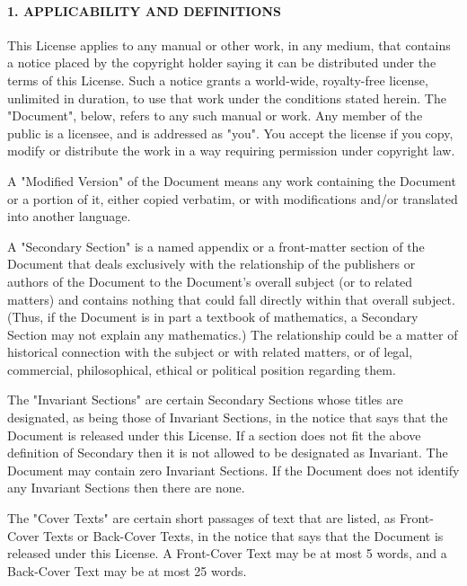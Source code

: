 \hypertarget{1-applicability-and-definitions}{%
\paragraph{1. APPLICABILITY AND
DEFINITIONS}\label{1-applicability-and-definitions}}

This License applies to any manual or other work, in any medium, that
contains a notice placed by the copyright holder saying it can be
distributed under the terms of this License. Such a notice grants a
world-wide, royalty-free license, unlimited in duration, to use that
work under the conditions stated herein. The "Document", below, refers
to any such manual or work. Any member of the public is a licensee, and
is addressed as "you". You accept the license if you copy, modify or
distribute the work in a way requiring permission under copyright law.

A "Modified Version" of the Document means any work containing the
Document or a portion of it, either copied verbatim, or with
modifications and/or translated into another language.

A "Secondary Section" is a named appendix or a front-matter section of
the Document that deals exclusively with the relationship of the
publishers or authors of the Document to the Document's overall subject
(or to related matters) and contains nothing that could fall directly
within that overall subject. (Thus, if the Document is in part a
textbook of mathematics, a Secondary Section may not explain any
mathematics.) The relationship could be a matter of historical
connection with the subject or with related matters, or of legal,
commercial, philosophical, ethical or political position regarding them.

The "Invariant Sections" are certain Secondary Sections whose titles are
designated, as being those of Invariant Sections, in the notice that
says that the Document is released under this License. If a section does
not fit the above definition of Secondary then it is not allowed to be
designated as Invariant. The Document may contain zero Invariant
Sections. If the Document does not identify any Invariant Sections then
there are none.

The "Cover Texts" are certain short passages of text that are listed, as
Front-Cover Texts or Back-Cover Texts, in the notice that says that the
Document is released under this License. A Front-Cover Text may be at
most 5 words, and a Back-Cover Text may be at most 25 words.

